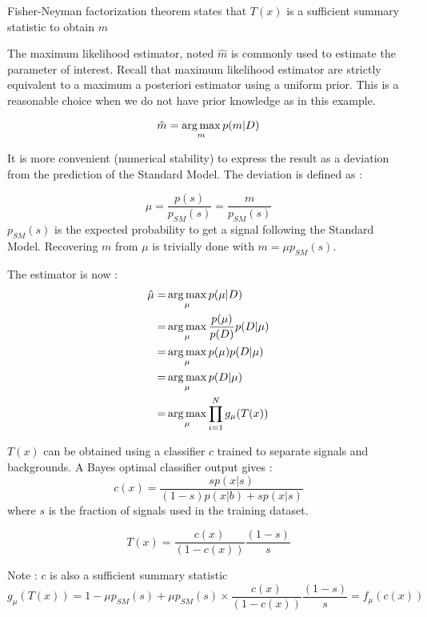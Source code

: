 Fisher-Neyman factorization theorem states that $T(x)$ is a sufficient summary statistic to obtain $m$

The maximum likelihood estimator, noted $\hat m$ is commonly used to estimate the parameter of interest.
Recall that maximum likelihood estimator are strictly equivalent to a maximum a posteriori estimator using a uniform prior.
This is a reasonable choice when we do not have prior knowledge as in this example.

\begin{equation}
	\hat m = \operatorname*{arg\,max}_m p(m | D)
\end{equation}

It is more convenient (numerical stability) to express the result as a deviation from the prediction of the Standard Model.
The deviation is defined as :

\begin{equation}
	\mu = \frac{p(s)}{p_{SM}(s)} = \frac{m}{p_{SM}(s)}
\end{equation}
$p_{SM}(s)$ is the expected probability to get a signal following the Standard Model.
Recovering $m$ from $\mu$ is trivially done with $m = \mu p_{SM}(s)$.

The estimator is now :
\begin{align}
	\hat\mu =& \operatorname*{arg\,max}_\mu p(\mu | D) \\
	     =& \operatorname*{arg\,max}_\mu \frac{p(\mu)}{p(D)} p(D | \mu) \\
	     =& \operatorname*{arg\,max}_\mu p(\mu) p(D | \mu) \\
	     =& \operatorname*{arg\,max}_\mu  p(D | \mu) \\
	     =& \operatorname*{arg\,max}_\mu  \prod_{i=1}^N g_\mu(T(x)) \\
\end{align}


$T(x)$ can be obtained using a classifier $c$ trained to separate signals and backgrounds.
A Bayes optimal classifier output gives :
\begin{equation}
	c(x) = \frac{s p(x|s)}{(1-s) p(x|b) + s p(x|s)}
\end{equation}
where $s$ is the fraction of signals used in the training dataset.

\begin{equation}
	T(x) = \frac{c(x)}{(1-c(x))} \frac{(1-s)}{s} 
\end{equation}


Note : $c$ is also a sufficient summary statistic
\begin{equation}
	g_\mu(T(x)) = 1 - \mu p_{SM}(s) + \mu p_{SM}(s) \times \frac{c(x)}{(1-c(x))} \frac{(1-s)}{s} = f_\mu(c(x))
\end{equation}



